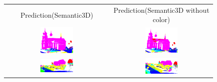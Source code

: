     \begin{figure}[h!]
        \centering
        \begin{tabular}{cc}
            Prediction(Semantic3D) & Prediction(Semantic3D without color) \\
            \includegraphics[width=0.33\textwidth, height=0.18\textheight]{images/ood_imgs/fout_sem3d/fout_1.pdf}&
            \includegraphics[width=0.33\textwidth, height=0.18\textheight]{images/sem3d_of/fout_sem3d_of_1.pdf}\\

            \includegraphics[width=0.33\textwidth, height=0.18\textheight]{images/ood_imgs/fout_sem3d/fout_2.pdf}&
            \includegraphics[width=0.33\textwidth, height=0.18\textheight]{images/sem3d_of/fout_sem3d_of_2.pdf}\\


\end{tabular}
\end{figure}
